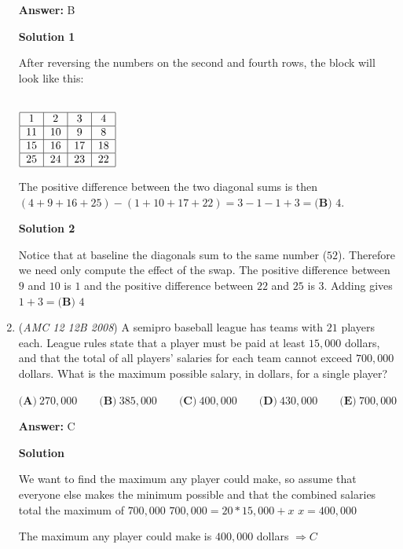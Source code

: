\begin{enumerate}
 \textbf{Answer: }B



\textbf{Solution 1}

After reversing the numbers on the second and fourth rows, the block will look like this: 

 $\begin{tabular}[t]{|c|c|c|c|} \multicolumn{4}{c}{}\\\hline 1&2&3&4\\\hline 11&10&9&8\\\hline 15&16&17&18\\\hline 25&24&23&22\\\hline \end{tabular}$

 The positive difference between the two diagonal sums is then $(4+9+16+25)-(1+10+17+22)=3-1-1+3=\boxed{\textbf{(B) } 4}$.

 



\textbf{Solution 2}

Notice that at baseline the diagonals sum to the same number ($52$).  Therefore we need only compute the effect of the swap.  The positive difference between $9$ and $10$ is $1$ and the positive difference between $22$ and $25$ is $3$. Adding gives $1+3=\boxed{\textbf{(B) } 4}$



	\item (\textit{AMC 12 12B 2008}) A semipro baseball league has teams with $21$ players each. League rules state that a player must be paid at least $15,000$ dollars, and that the total of all players' salaries for each team cannot exceed $700,000$ dollars. What is the maximum possible salary, in dollars, for a single player?


 $\textbf{(A)}\ 270,000 \qquad \textbf{(B)}\ 385,000 \qquad \textbf{(C)}\ 400,000 \qquad \textbf{(D)}\ 430,000 \qquad \textbf{(E)}\ 700,000$

 \textbf{Answer: }C



\textbf{Solution}

We want to find the maximum any player could make, so assume that everyone else makes the minimum possible and that the combined salaries total the maximum of $700,000$
$700,000 = 20 * 15,000 + x$
$x = 400,000$

 The maximum any player could make is $400,000$ dollars $\Rightarrow C$




\end{enumerate}
